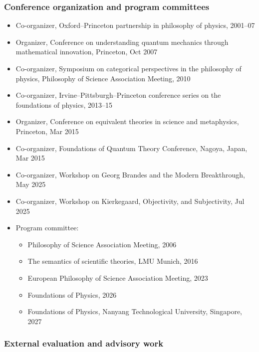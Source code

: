\documentclass[11pt]{article}
\newcommand{\rubric}[1]{\subsubsection*{#1}}
\begin{document}
\rubric{Conference organization and program committees}

\begin{itemize}
\item Co-organizer, Oxford--Princeton partnership in philosophy of physics,
  2001--07
\item Organizer, Conference on understanding quantum mechanics through
  mathematical innovation, Princeton, Oct 2007
\item Co-organizer, Symposium on categorical perspectives in the philosophy of
  physics, Philosophy of Science Association Meeting, 2010
\item Co-organizer, Irvine--Pittsburgh--Princeton conference series on the
  foundations of physics, 2013--15
\item Organizer, Conference on equivalent theories in science and metaphysics,
  Princeton, Mar 2015
\item Co-organizer, Foundations of Quantum Theory Conference, Nagoya, Japan,
  Mar 2015
\item Co-organizer, Workshop on Georg Brandes and the Modern Breakthrough,
  May 2025
\item Co-organizer, Workshop on Kierkegaard, Objectivity, and Subjectivity,
  Jul 2025
\item Program committee:
  \begin{itemize}
  \item Philosophy of Science Association Meeting, 2006
  \item The semantics of scientific theories, LMU Munich, 2016
  \item European Philosophy of Science Association Meeting, 2023
  \item Foundations of Physics, 2026
  \item Foundations of Physics, Nanyang Technological University, Singapore,
    2027
  \end{itemize}
\end{itemize}

\rubric{External evaluation and advisory work}
\end{document}
